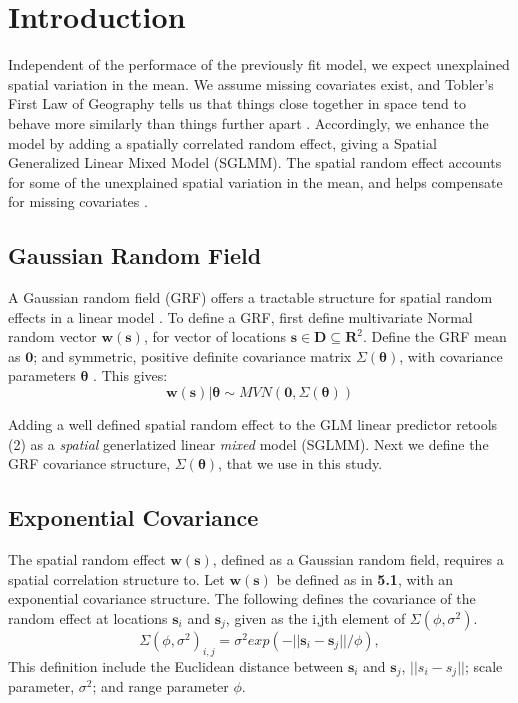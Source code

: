 
\section{Introduction} %

Independent of the performace of the previously fit model, we expect unexplained spatial variation in the mean. We assume missing covariates exist, and Tobler's First Law of Geography tells us that things close together in space tend to behave more similarly than things further apart \citep{Tobler1970}. Accordingly, we enhance the model by adding a spatially correlated random effect, giving a Spatial Generalized Linear Mixed Model (SGLMM). The spatial random effect accounts for some of the unexplained spatial variation in the mean, and helps compensate for missing covariates \citep{Banerjee2008}. 

\subsection{Gaussian Random Field} %

A Gaussian random field (GRF) offers a tractable structure for spatial random effects in a linear model \citep{Gelfand2010}. To define a GRF, first define multivariate Normal random vector $\pmb{w}(\pmb{s})$, for vector of locations $\pmb{s} \in \pmb{D} \subseteq \pmb{R}^{2}$. Define the GRF mean as $\pmb{0}$; and symmetric, positive definite covariance matrix $\Sigma(\pmb{\theta})$, with covariance parameters $\pmb{\theta}$ \citep{Haran2011}. This gives:
$$ \pmb{w}(\pmb{s}) | \pmb{\theta} \sim MVN(\pmb{0}, \Sigma(\pmb{\theta})) $$

Adding a well defined spatial random effect to the GLM linear predictor retools (2) as a {\it spatial} generlatized linear {\it mixed} model (SGLMM). Next we define the GRF covariance structure, $\Sigma(\pmb{\theta})$, that we use in this study.

\subsection{Exponential Covariance}
The spatial random effect $\pmb{w}(\pmb{s})$, defined as a Gaussian random field, requires a spatial correlation structure to. Let $\pmb{w}(\pmb{s})$ be defined as in {\bf 5.1}, with an exponential covariance structure. The following defines the covariance of the random effect at locations $\pmb{s}_{i}$ and $\pmb{s}_{j}$, given as the i,jth element of $\Sigma(\phi, \sigma^{2})$.
\begin{equation}
\Sigma(\phi, \sigma^{2})_{i,j} = \sigma^{2} exp(-||\pmb{s}_{i} - \pmb{s}_{j}||/\phi),
\end{equation}
This definition include the Euclidean distance between $\pmb{s}_{i}$ and $\pmb{s}_{j}$, $||s_{i} - s_{j}||$; scale parameter, $\sigma^{2}$; and range parameter $\phi$.

